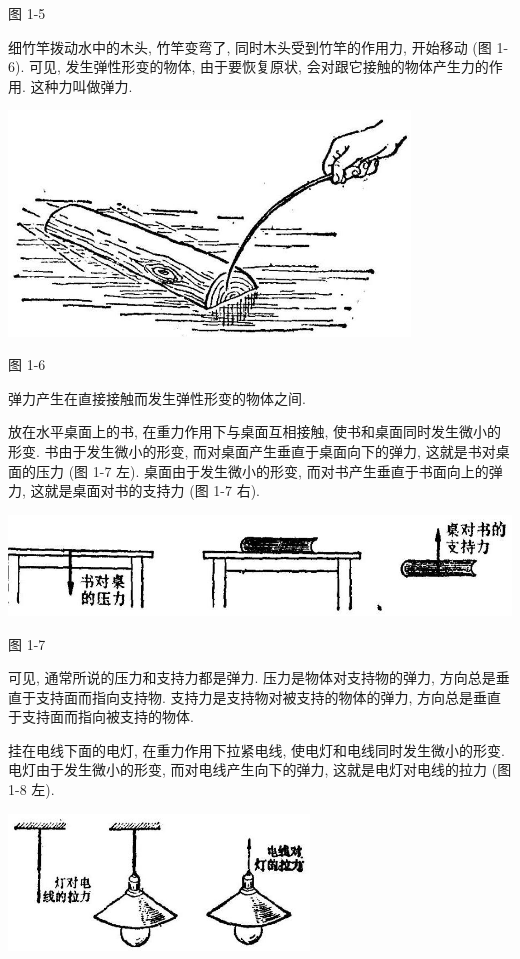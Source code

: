 \documentclass[10pt]{article}
\begin{document}
图 1-5

细竹竿拨动水中的木头, 竹竿变弯了, 同时木头受到竹竿的作用力, 开始移动 (图 1-6). 可见, 发生弹性形变的物体, 由于要恢复原状, 会对跟它接触的物体产生力的作用. 这种力叫做弹力.

\begin{center}
\includegraphics[max width=0.8\textwidth]{images/01912d55-147c-70aa-b0e0-1782a122f948_21_487951.jpg}
\end{center}

图 1-6

弹力产生在直接接触而发生弹性形变的物体之间.

放在水平桌面上的书, 在重力作用下与桌面互相接触, 使书和桌面同时发生微小的形变. 书由于发生微小的形变, 而对桌面产生垂直于桌面向下的弹力, 这就是书对桌面的压力 (图 1-7 左). 桌面由于发生微小的形变, 而对书产生垂直于书面向上的弹力, 这就是桌面对书的支持力 (图 1-7 右).

\begin{center}
\includegraphics[max width=1.0\textwidth]{images/01912d55-147c-70aa-b0e0-1782a122f948_22_890095.jpg}
\end{center}

图 1-7

可见, 通常所说的压力和支持力都是弹力. 压力是物体对支持物的弹力, 方向总是垂直于支持面而指向支持物. 支持力是支持物对被支持的物体的弹力, 方向总是垂直于支持面而指向被支持的物体.

挂在电线下面的电灯, 在重力作用下拉紧电线, 使电灯和电线同时发生微小的形变. 电灯由于发生微小的形变, 而对电线产生向下的弹力, 这就是电灯对电线的拉力 (图 1-8 左).

\begin{center}
\includegraphics[max width=0.6\textwidth]{images/01912d55-147c-70aa-b0e0-1782a122f948_22_129010.jpg}
\end{center}
\end{document}
